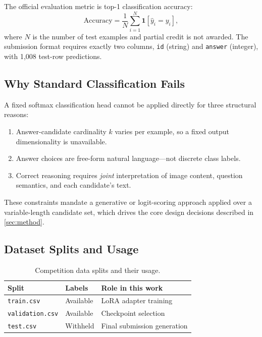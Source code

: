 \documentclass[11pt,twocolumn]{article}
\begin{document}
The official evaluation metric is top-1 classification accuracy:
\begin{equation}
  \mathrm{Accuracy} = \frac{1}{N}\sum_{i=1}^{N}\mathbf{1}\!\left[\hat{y}_i = y_i\right],
  \label{eq:acc}
\end{equation}
where $N$ is the number of test examples and partial credit is not awarded. The submission format requires exactly two columns, \texttt{id} (string) and \texttt{answer} (integer), with 1,008 test-row predictions.

\subsection{Why Standard Classification Fails}

A fixed softmax classification head cannot be applied directly for three structural reasons:
\begin{enumerate}[leftmargin=*, noitemsep]
  \item Answer-candidate cardinality $k$ varies per example, so a fixed output dimensionality is unavailable.
  \item Answer choices are free-form natural language---not discrete class labels.
  \item Correct reasoning requires \emph{joint} interpretation of image content, question semantics, and each candidate's text.
\end{enumerate}
These constraints mandate a generative or logit-scoring approach applied over a variable-length candidate set, which drives the core design decisions described in \ref{sec:method}.

\subsection{Dataset Splits and Usage}
\label{sec:data-splits}

\begin{table}[h]
\centering
\small
\setlength{\tabcolsep}{3pt}
\begin{tabularx}{\columnwidth}{>{\raggedright\arraybackslash}p{} >{\centering\arraybackslash}p{} X}
\toprule
\textbf{Split} & \textbf{Labels} & \textbf{Role in this work}\\
\midrule
\texttt{train.csv}      & Available & LoRA adapter training\\
\texttt{validation.csv} & Available & Checkpoint selection\\
\texttt{test.csv}       & Withheld  & Final submission generation\\
\bottomrule
\end{tabularx}
\caption{Competition data splits and their usage.}
\label{tab:splits}
\end{table}
\end{document}
